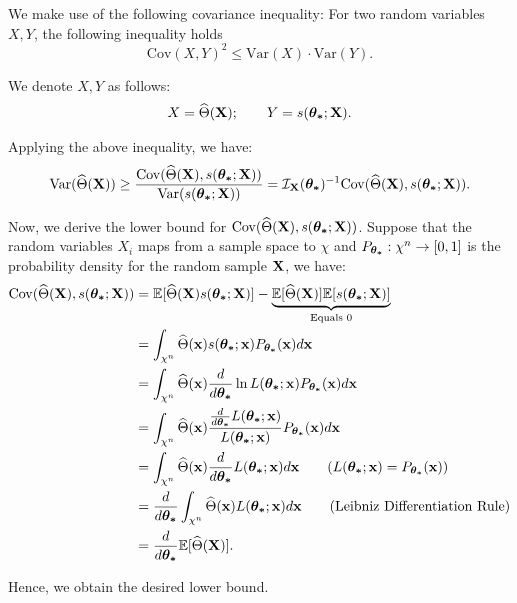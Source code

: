 \begin{proof*}
    We make use of the following covariance inequality: For two random variables $X, Y$, the following inequality holds
    \begin{equation}
        \mathrm{Cov}(X, Y)^2 \le \mathrm{Var}(X)\cdot\mathrm{Var}(Y).
    \end{equation} 

    \noindent We denote $X, Y$ as follows:
    \begin{align*}
        X = \widehat{\Theta}({\bf X}); \qquad Y = s(\boldsymbol{\theta_*};{\bf X}). 
    \end{align*} 

    \noindent Applying the above inequality, we have:
    \begin{align*}
        \mathrm{Var}(\widehat{\Theta}({\bf X})) \ge \frac{\mathrm{Cov}(\widehat{\Theta}({\bf X}), s(\boldsymbol{\theta_*};{\bf X}))}{\mathrm{Var}(s(\boldsymbol{\theta_*};{\bf X}))} = \mathcal{I}_{{\bf X}}(\boldsymbol{\theta_*})^{-1}\mathrm{Cov}(\widehat{\Theta}({\bf X}), s(\boldsymbol{\theta_*};{\bf X})).
    \end{align*} 

    \noindent Now, we derive the lower bound for $\mathrm{Cov}(\widehat{\Theta}({\bf X}), s(\boldsymbol{\theta_*};{\bf X}))$. Suppose that the random variables $X_i$ maps from a sample space to $\chi$ and $P_{\boldsymbol{\theta_*}}:\chi^n\to [0,1]$ is the probability density for the random sample ${\bf X}$, we have:
    \begin{align*}
        \mathrm{Cov}(\widehat{\Theta}({\bf X}), s(\boldsymbol{\theta_*};{\bf X})) &= \mathbb{E}[\widehat{\Theta}({\bf X})s(\boldsymbol{\theta_*};{\bf X})] - \underbrace{\mathbb{E}[\widehat{\Theta}({\bf X})]\mathbb{E}[s(\boldsymbol{\theta_*};{\bf X})]}_{\text{Equals } 0} \\
        &= \int_{\chi^n} \widehat{\Theta}({\bf x}) s(\boldsymbol{\theta_*};{\bf x})P_{\boldsymbol{\theta_*}}({\bf x})d{\bf x} \\
        &= \int_{\chi^n} \widehat{\Theta}({\bf x}) \frac{d}{d\boldsymbol{\theta_*}}\ln L(\boldsymbol{\theta_*};{\bf x}) P_{\boldsymbol{\theta_*}}({\bf x})d{\bf x} \\
        &= \int_{\chi^n} \widehat{\Theta}({\bf x}) \frac{\frac{d}{d\boldsymbol{\theta_*}}L(\boldsymbol{\theta_*};{\bf x})}{L(\boldsymbol{\theta_*};{\bf x})}P_{\boldsymbol{\theta_*}}({\bf x})d{\bf x} \\
        &= \int_{\chi^n} \widehat{\Theta}({\bf x})\frac{d}{d\boldsymbol{\theta_*}}L(\boldsymbol{\theta_*};{\bf x})d{\bf x} \qquad (L(\boldsymbol{\theta_*};{\bf x}) = P_{\boldsymbol{\theta_*}}({\bf x})) \\
        &= \frac{d}{d\boldsymbol{\theta_*}}\int_{\chi^n}\widehat{\Theta}({\bf x})L(\boldsymbol{\theta_*};{\bf x})d{\bf x} \qquad (\text{Leibniz Differentiation Rule}) \\
        &= \frac{d}{d\boldsymbol{\theta_*}}\mathbb{E}[\widehat{\Theta}({\bf X})].
    \end{align*} 

    \noindent Hence, we obtain the desired lower bound.
\end{proof*} 




